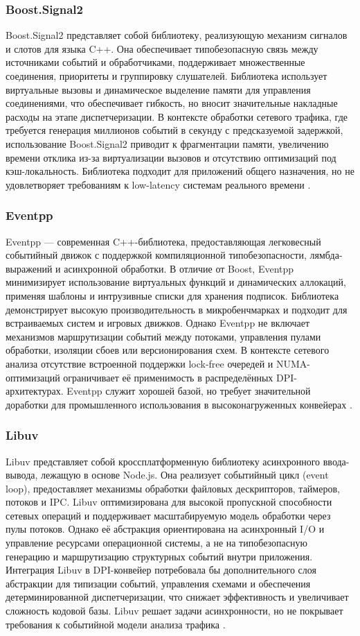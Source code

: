 \subsubsection{Boost.Signal2}
Boost.Signal2 представляет собой библиотеку, реализующую механизм сигналов и слотов для языка C++. Она обеспечивает типобезопасную связь между источниками событий и обработчиками, поддерживает множественные соединения, приоритеты и группировку слушателей. Библиотека использует виртуальные вызовы и динамическое выделение памяти для управления соединениями, что обеспечивает гибкость, но вносит значительные накладные расходы на этапе диспетчеризации. В контексте обработки сетевого трафика, где требуется генерация миллионов событий в секунду с предсказуемой задержкой, использование Boost.Signal2 приводит к фрагментации памяти, увеличению времени отклика из-за виртуализации вызовов и отсутствию оптимизаций под кэш-локальность. Библиотека подходит для приложений общего назначения, но не удовлетворяет требованиям к low-latency системам реального времени \cite{boost2023signal}.

\subsubsection{Eventpp}
Eventpp — современная C++-библиотека, предоставляющая легковесный событийный движок с поддержкой компиляционной типобезопасности, лямбда-выражений и асинхронной обработки. В отличие от Boost, Eventpp минимизирует использование виртуальных функций и динамических аллокаций, применяя шаблоны и интрузивные списки для хранения подписок. Библиотека демонстрирует высокую производительность в микробенчмарках и подходит для встраиваемых систем и игровых движков. Однако Eventpp не включает механизмов маршрутизации событий между потоками, управления пулами обработки, изоляции сбоев или версионирования схем. В контексте сетевого анализа отсутствие встроенной поддержки lock-free очередей и NUMA-оптимизаций ограничивает её применимость в распределённых DPI-архитектурах. Eventpp служит хорошей базой, но требует значительной доработки для промышленного использования в высоконагруженных конвейерах \cite{eventpp2023doc}.

\subsubsection{Libuv}
Libuv представляет собой кроссплатформенную библиотеку асинхронного ввода-вывода, лежащую в основе Node.js. Она реализует событийный цикл (event loop), предоставляет механизмы обработки файловых дескрипторов, таймеров, потоков и IPC. Libuv оптимизирована для высокой пропускной способности сетевых операций и поддерживает масштабируемую модель обработки через пулы потоков. Однако её абстракция ориентирована на асинхронный I/O и управление ресурсами операционной системы, а не на типобезопасную генерацию и маршрутизацию структурных событий внутри приложения. Интеграция Libuv в DPI-конвейер потребовала бы дополнительного слоя абстракции для типизации событий, управления схемами и обеспечения детерминированной диспетчеризации, что снижает эффективность и увеличивает сложность кодовой базы. Libuv решает задачи асинхронности, но не покрывает требования к событийной модели анализа трафика \cite{libuv2023doc}.

